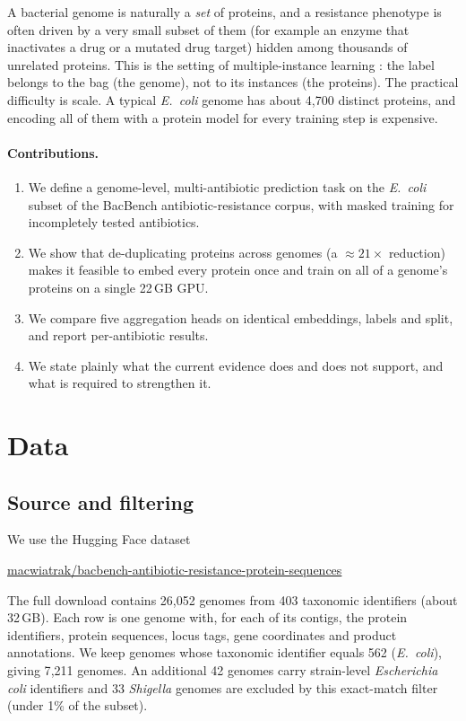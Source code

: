 \documentclass[11pt,a4paper]{article}
\begin{document}
A bacterial genome is naturally a \emph{set} of proteins, and a resistance phenotype is often driven by a very small subset of them
(for example an enzyme that inactivates a drug or a mutated drug target) hidden among thousands of unrelated proteins.
This is the setting of multiple-instance learning \citep{ilse2018}: the label belongs to the bag (the genome), not to its instances (the proteins).
The practical difficulty is scale. A typical \textit{E.~coli} genome has about 4{,}700 distinct proteins, and encoding all of them with a protein model for every training step is expensive.

\paragraph{Contributions.}
\begin{enumerate}
  \item We define a genome-level, multi-antibiotic prediction task on the \textit{E.~coli} subset of the BacBench antibiotic-resistance corpus, with masked training for incompletely tested antibiotics.
  \item We show that de-duplicating proteins across genomes (a $\approx 21\times$ reduction) makes it feasible to embed every protein once and train on all of a genome's proteins on a single 22\,GB GPU.
  \item We compare five aggregation heads on identical embeddings, labels and split, and report per-antibiotic results.
  \item We state plainly what the current evidence does and does not support, and what is required to strengthen it.
\end{enumerate}

\section{Data}
\subsection{Source and filtering}
We use the Hugging Face dataset
\begin{center}\url{macwiatrak/bacbench-antibiotic-resistance-protein-sequences}\end{center}
\noindent The full download \citep{bacbench} contains 26{,}052 genomes from 403 taxonomic identifiers (about 32\,GB).
Each row is one genome with, for each of its contigs, the protein identifiers, protein sequences, locus tags, gene coordinates and product annotations.
We keep genomes whose taxonomic identifier equals 562 (\textit{E.~coli}), giving 7{,}211 genomes.
An additional 42 genomes carry strain-level \textit{Escherichia coli} identifiers and 33 \textit{Shigella} genomes are excluded by this exact-match filter (under 1\% of the subset).
\end{document}
